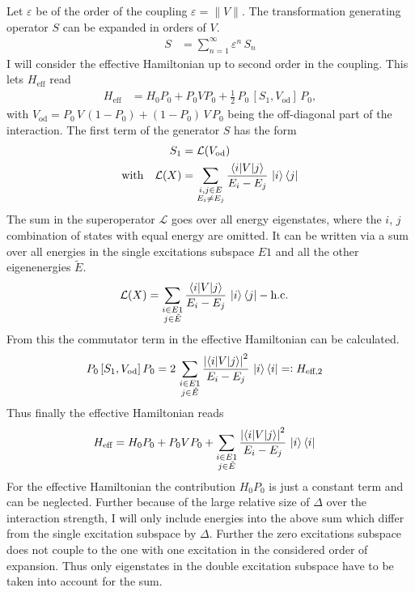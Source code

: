 Let $\varepsilon$ be of the order of the coupling $\varepsilon=\lVert V \rVert$. The transformation generating operator $S$ can be expanded in orders of $V$.
\begin{align*}
    S&= \sum_{n=1}^\infty \varepsilon^n\,S_n
\end{align*}
I will consider the effective Hamiltonian up to second order in the coupling. This lets $H_\text{eff}$ read
\begin{align*}
    H_\text{eff}&=H_0P_0+P_0VP_0+\frac12\,P_0\,[S_1,V_\text{od}]\,P_0,
\end{align*}
with $V_\text{od}=P_0\,V\,(1-P_0)+(1-P_0)\,V\,P_0$ being the off-diagonal part of the interaction. The first term of the generator $S$ has the form
\begin{align*}
    S_1&=\mathcal{L}(V_\text{od})\\
    \text{with}\quad \mathcal{L}(X)&=\sum_{\substack{i,j\in E\\E_i\neq E_j}}\frac{\braket{i|V|j}}{E_i-E_j}\,\ket{i}\bra{j}
\end{align*}
The sum in the superoperator $\mathcal{L}$ goes over all energy eigenstates, where the $i$, $j$ combination of states with equal energy are omitted. It can be written via a sum over all energies in the single excitations subspace $E1$ and all the other eigenenergies $\tilde{E}$.
\begin{align*}
    \mathcal{L}(X)&=\sum_{\substack{i\in E1\\j\in\tilde{E}}}\frac{\braket{i|V|j}}{E_i-E_j}\,\ket{i}\bra{j}-\text{h.c.}
\end{align*}
From this the commutator term in the effective Hamiltonian can be calculated.
\begin{align*}
    P_0\,[S_1,V_\text{od}]\,P_0&= 2\,\sum_{\substack{i\in E1\\j\in\tilde{E}}}\frac{\left|\braket{i|V|j}\right|^2}{E_i-E_j}\,\ket{i}\bra{i}=\vcentcolon H_{\text{eff},2}
\end{align*}
Thus finally the effective Hamiltonian reads
\begin{align*}
    H_\text{eff}&=H_0P_0+P_0VP_0+\sum_{\substack{i\in E1\\j\in\tilde{E}}}\frac{\left|\braket{i|V|j}\right|^2}{E_i-E_j}\,\ket{i}\bra{i}
\end{align*}
For the effective Hamiltonian the contribution $H_0P_0$ is just a constant term and can be neglected. Further because of the large relative size of $\Delta$ over the interaction strength, I will only include energies into the above sum which differ from the single excitation subspace by $\Delta$. Further the zero excitations subspace does not couple to the one with one excitation in the considered order of expansion. Thus only eigenstates in the double excitation subspace have to be taken into account for the sum.
